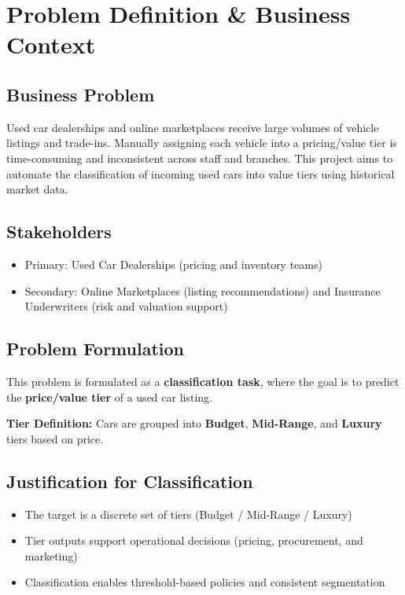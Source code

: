 \documentclass[12pt, a4paper]{article}
\begin{document}
\newpage
\setcounter{tocdepth}{3}
\setcounter{secnumdepth}{3}
\tableofcontents
\newpage
\section{Problem Definition \& Business Context}

\subsection{Business Problem}
Used car dealerships and online marketplaces receive large volumes of vehicle listings and trade-ins. Manually assigning each vehicle into a pricing/value tier is time-consuming and inconsistent across staff and branches. This project aims to automate the classification of incoming used cars into value tiers using historical market data.

\subsection{Stakeholders}

\begin{itemize}
  \item Primary: Used Car Dealerships (pricing and inventory teams)
  \item Secondary: Online Marketplaces (listing recommendations) and Insurance Underwriters (risk and valuation support)
\end{itemize}

\subsection{Problem Formulation}

This problem is formulated as a \textbf{classification task}, where the goal is to predict the \textbf{price/value tier} of a used car listing.

\textbf{Tier Definition:} Cars are grouped into \textbf{Budget}, \textbf{Mid-Range}, and \textbf{Luxury} tiers based on price.
\subsection{Justification for Classification}

\begin{itemize}
  \item The target is a discrete set of tiers (Budget / Mid-Range / Luxury)
  \item Tier outputs support operational decisions (pricing, procurement, and marketing)
  \item Classification enables threshold-based policies and consistent segmentation
\end{itemize}
\end{document}
